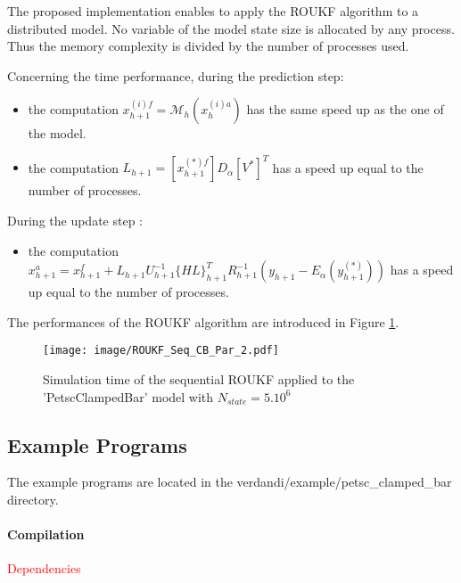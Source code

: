 \documentclass{tufte-book}
\begin{document}
The proposed implementation enables to apply the ROUKF algorithm to a distributed model.  No variable of the model state size is allocated by any process. Thus the memory complexity is divided by the number of processes used.

Concerning the time performance, during the prediction step:

\begin{itemize}
 \item the computation  $ x_{h+1}^{(i)f} = \mathcal{M}_{h}(x_{h}^{(i)a})$ has the same speed up as the one of the model.
 \item the computation  $ L_{h+1} = [x_{h+1}^{(*)f}]D_\alpha [V^*]^T $ has a speed up equal to the number of processes.
 \end{itemize}
During the update step :
\begin{itemize}
\item the computation  $ x_{h+1}^a = x_{h+1}^f + L_{h+1}U_{h+1}^{-1}\{HL\}_{h+1}^T R_{h+1}^{-1} (y_{h+1}-E_\alpha(y_{h+1}^{(*)})) $ has a speed up equal to the number of processes.\\
\end{itemize}

The performances of the ROUKF algorithm are introduced in Figure  \ref{fig:roukf_time}.


\begin{figure}
  \caption{Simulation time of the sequential  ROUKF applied to the 'PetscClampedBar' model with $N_{state} = 5.10^6$}
  \label{fig:roukf_time}

\texttt{[image: image/ROUKF\_Seq\_CB\_Par\_2.pdf]}
\end{figure}



\hypertarget{seq-par-ep}{}\subsection{Example Programs}\label{seq-par-ep}

The example programs are located in the  verdandi/example/petsc\_clamped\_bar directory.


\hypertarget{seq-par-ep-c}{}\paragraph{Compilation}\label{seq-par-ep-c}


\par \textcolor{red}{Dependencies}\\
\end{document}
